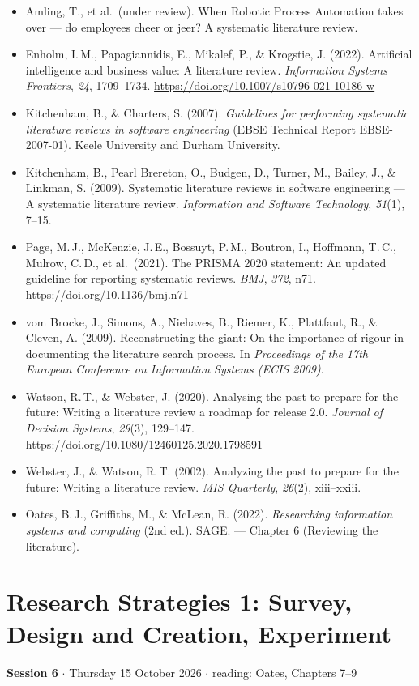 \documentclass[11pt,a4paper,british,twoside=false,headings=small,chapterprefix=false,numbers=noenddot]{scrbook}
\newcommand{\sessionhead}[2]{\begin{tcolorbox}[enhanced, colback=uiamutedblue, colframe=uiamutedblue, arc=1.5pt, left=6pt, right=6pt]
  \small \textbf{Session #1} \;$\cdot$\; #2\end{tcolorbox}}
\begin{document}
\begin{itemize}\small
  \item Amling, T., et al.\ (under review). When Robotic Process Automation takes over --- do employees cheer or jeer? A systematic literature review.
  \item Enholm, I.\,M., Papagiannidis, E., Mikalef, P., \& Krogstie, J. (2022). Artificial intelligence and business value: A literature review. \emph{Information Systems Frontiers}, \emph{24}, 1709--1734. \url{https://doi.org/10.1007/s10796-021-10186-w}
  \item Kitchenham, B., \& Charters, S. (2007). \emph{Guidelines for performing systematic literature reviews in software engineering} (EBSE Technical Report EBSE-2007-01). Keele University and Durham University.
  \item Kitchenham, B., Pearl Brereton, O., Budgen, D., Turner, M., Bailey, J., \& Linkman, S. (2009). Systematic literature reviews in software engineering --- A systematic literature review. \emph{Information and Software Technology}, \emph{51}(1), 7--15.
  \item Page, M.\,J., McKenzie, J.\,E., Bossuyt, P.\,M., Boutron, I., Hoffmann, T.\,C., Mulrow, C.\,D., et al.\ (2021). The PRISMA 2020 statement: An updated guideline for reporting systematic reviews. \emph{BMJ}, \emph{372}, n71. \url{https://doi.org/10.1136/bmj.n71}
  \item vom Brocke, J., Simons, A., Niehaves, B., Riemer, K., Plattfaut, R., \& Cleven, A. (2009). Reconstructing the giant: On the importance of rigour in documenting the literature search process. In \emph{Proceedings of the 17th European Conference on Information Systems (ECIS 2009)}.
  \item Watson, R.\,T., \& Webster, J. (2020). Analysing the past to prepare for the future: Writing a literature review a roadmap for release 2.0. \emph{Journal of Decision Systems}, \emph{29}(3), 129--147. \url{https://doi.org/10.1080/12460125.2020.1798591}
  \item Webster, J., \& Watson, R.\,T. (2002). Analyzing the past to prepare for the future: Writing a literature review. \emph{MIS Quarterly}, \emph{26}(2), xiii--xxiii.
  \item Oates, B.\,J., Griffiths, M., \& McLean, R. (2022). \emph{Researching information systems and computing} (2nd ed.). SAGE. --- Chapter 6 (Reviewing the literature).
\end{itemize}

\chapter{Research Strategies 1: Survey, Design and Creation, Experiment}
\label{ch:6}
\sessionhead{6}{Thursday 15 October 2026 \;$\cdot$\; reading: Oates, Chapters 7--9}
\end{document}
